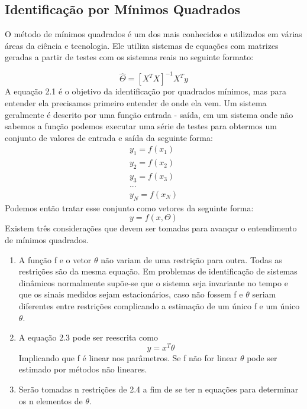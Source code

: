 \subsection{Identificação por Mínimos Quadrados}
O método de mínimos quadrados é um dos mais conhecidos e utilizados em várias áreas da ciência e tecnologia. Ele utiliza sistemas de equações com matrizes geradas a partir de testes com os sistemas reais no seguinte formato:


\begin{equation}
	\hat{\Theta}=[X^TX]^{-1}X^Ty
\end{equation}
A equação 2.1 é o objetivo da identificação por quadrados mínimos, mas para entender ela precisamos primeiro entender de onde ela vem.
\newline 
Um sistema geralmente é descrito por uma função entrada - saída, em um sistema onde não sabemos a função podemos executar uma série de testes para obtermos um conjunto de valores de entrada e saída da seguinte forma:
\begin{equation}
\begin{array}{c}
y_1=f(x_1) \\
y_2=f(x_2) \\
y_3=f(x_3) \\
... \\
y_N=f(x_N)
\end{array}
\end{equation}
Podemos então tratar esse conjunto como vetores da seguinte forma:
\begin{equation}
y=f(x,\Theta)
\end{equation}
Existem três considerações que devem ser tomadas para avançar o entendimento de mínimos quadrados.
\begin{enumerate}
	\item A função f e o vetor $\theta$ não variam de uma restrição para outra. Todas as restrições são da mesma equação. Em problemas de identificação de sistemas dinâmicos normalmente supõe-se que o sistema seja invariante no tempo e que os sinais medidos sejam estacionários, caso não fossem f e $\theta$ seriam diferentes entre restrições complicando a estimação de um único f e um único $\theta$.
	\item A equação 2.3 pode ser reescrita como
	\begin{equation}
	y=x^T \theta
	\end{equation}
	Implicando que f é linear nos parâmetros. Se f não for linear $\theta$ pode ser estimado por métodos não lineares.
	\item Serão tomadas n restrições de 2.4 a fim de se ter n equações para determinar os n elementos de $\theta$.
\end{enumerate}

